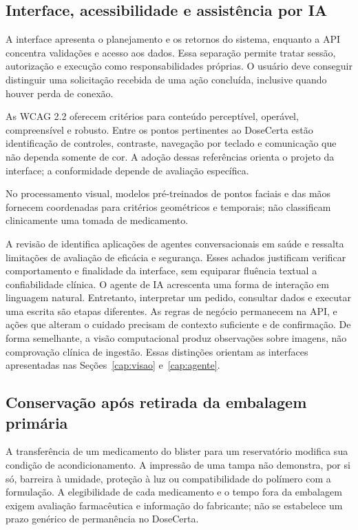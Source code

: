 \subsection{Interface, acessibilidade e assistência por IA}
A interface apresenta o planejamento e os retornos do sistema, enquanto a API concentra validações e acesso aos dados. Essa separação permite tratar sessão, autorização e execução como responsabilidades próprias. O usuário deve conseguir distinguir uma solicitação recebida de uma ação concluída, inclusive quando houver perda de conexão.

As WCAG 2.2 oferecem critérios para conteúdo perceptível, operável, compreensível e robusto. Entre os pontos pertinentes ao DoseCerta estão identificação de controles, contraste, navegação por teclado e comunicação que não dependa somente de cor. A adoção dessas referências orienta o projeto da interface; a conformidade depende de avaliação específica. \cite{WCAG22}

No processamento visual, modelos pré-treinados de pontos faciais e das mãos fornecem coordenadas para critérios geométricos e temporais; não classificam clinicamente uma tomada de medicamento. \cite{MEDIAPIPE_FACE,MEDIAPIPE_HAND}

A revisão de  identifica aplicações de agentes conversacionais em saúde e ressalta limitações de avaliação de eficácia e segurança. Esses achados justificam verificar comportamento e finalidade da interface, sem equiparar fluência textual a confiabilidade clínica. O agente de IA acrescenta uma forma de interação em linguagem natural. Entretanto, interpretar um pedido, consultar dados e executar uma escrita são etapas diferentes. As regras de negócio permanecem na API, e ações que alteram o cuidado precisam de contexto suficiente e de confirmação. De forma semelhante, a visão computacional produz observações sobre imagens, não comprovação clínica de ingestão. Essas distinções orientam as interfaces apresentadas nas Seções~\ref{cap:visao} e~\ref{cap:agente}.

\subsection{Conservação após retirada da embalagem primária}
A transferência de um medicamento do blister para um reservatório modifica sua condição de acondicionamento. A impressão de uma tampa não demonstra, por si só, barreira à umidade, proteção à luz ou compatibilidade do polímero com a formulação. A elegibilidade de cada medicamento e o tempo fora da embalagem exigem avaliação farmacêutica e informação do fabricante; não se estabelece um prazo genérico de permanência no DoseCerta.



